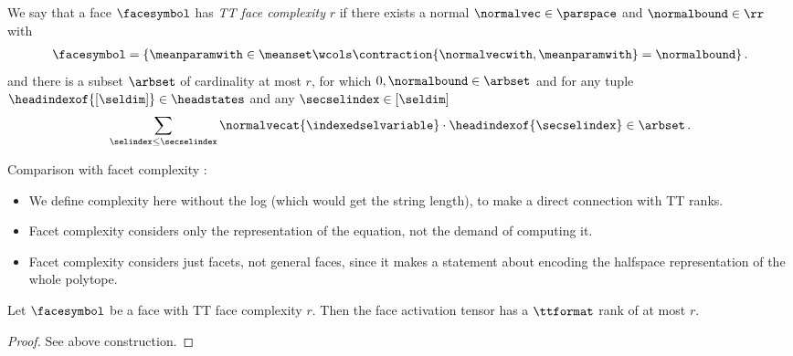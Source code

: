 \begin{definition}
    We say that a face $\facesymbol$ has \emph{TT face complexity} $r$ if there exists a normal $\normalvec\in\parspace$ and $\normalbound\in\rr$ with
    \begin{align*}
        \facesymbol =
        \{\meanparamwith\in\meanset \wcols \contraction{\normalvecwith,\meanparamwith}=\normalbound \}\, .
    \end{align*}
    and there is a subset $\arbset$ of cardinality at most $r$, for which $0,\normalbound\in\arbset$ and for any tuple $\headindexof{[\seldim]}\in\headstates$ and any $\secselindex\in[\seldim]$
    \begin{align*}
        \sum_{\selindex\leq\secselindex} \normalvecat{\indexedselvariable} \cdot \headindexof{\secselindex} \in \arbset \, .
    \end{align*}
\end{definition}

Comparison with facet complexity \cite[Definition 6.2.2]{grotschel_geometric_1993}:
\begin{itemize}
    \item We define complexity here without the log (which would get the string length), to make a direct connection with TT ranks.
    \item Facet complexity considers only the representation of the equation, not the demand of computing it.
    \item Facet complexity considers just facets, not general faces, since it makes a statement about encoding the halfspace representation of the whole polytope.
\end{itemize}

\begin{theorem}
    Let $\facesymbol$ be a face with TT face complexity $r$.
    Then the face activation tensor has a $\ttformat$ rank of at most $r$.
\end{theorem}
\begin{proof}
    See above construction.
\end{proof}

